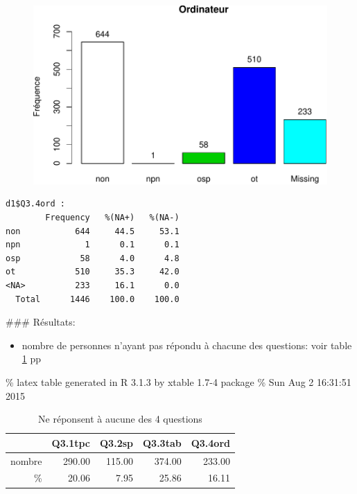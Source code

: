 \documentclass[]{article}
\begin{document}
\begin{figure}[htbp]
\centering
\includegraphics{qs_etudiants_files/figure-latex/outils-4.pdf}
\end{figure}

\begin{verbatim}
d1$Q3.4ord : 
        Frequency   %(NA+)   %(NA-)
non           644     44.5     53.1
npn             1      0.1      0.1
osp            58      4.0      4.8
ot            510     35.3     42.0
<NA>          233     16.1      0.0
  Total      1446    100.0    100.0
\end{verbatim}

\#\#\# Résultats:

\begin{itemize}
\itemsep1pt\parskip0pt
\item
  nombre de personnes n'ayant pas répondu à chacune des questions: voir
  table \ref{lab.tnr} pp \pageref{lab.tnr}
\end{itemize}

\% latex table generated in R 3.1.3 by xtable 1.7-4 package \% Sun Aug 2
16:31:51 2015

\begin{table}[ht]
\centering
\begin{tabular}{rrrrr}
  \hline
 & Q3.1tpc & Q3.2sp & Q3.3tab & Q3.4ord \\ 
  \hline
nombre & 290.00 & 115.00 & 374.00 & 233.00 \\ 
   \%  & 20.06 & 7.95 & 25.86 & 16.11 \\ 
   \hline
\end{tabular}
\caption{Ne réponsent à aucune des 4 questions} 
\label{lab.tnr}
\end{table}
\end{document}
